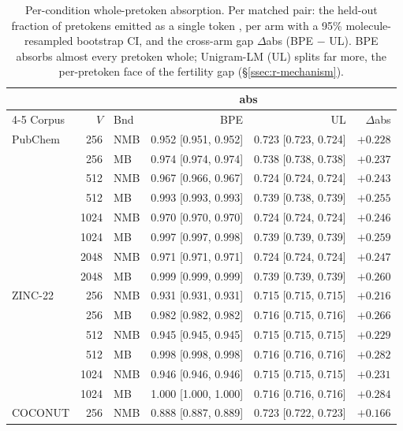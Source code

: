 \begin{table}[htbp]
  \centering
  \caption{Per-condition whole-pretoken absorption. Per matched pair: the held-out fraction of pretokens emitted as a single token \citep{reddy2025diminishing-tokenization}, per arm with a 95\% molecule-resampled bootstrap CI, and the cross-arm gap $\Delta$abs (BPE $-$ UL). BPE absorbs almost every pretoken whole; Unigram-LM (UL) splits far more, the per-pretoken face of the fertility gap (\S\ref{ssec:r-mechanism}).}
  \label{tab:results-absorption}
  \footnotesize
  \begin{tabular}{@{}l r l r r r@{}}
    \toprule
    & & & \multicolumn{2}{c}{abs} & \\
    \cmidrule(lr){4-5}
    Corpus & $V$ & Bnd & BPE & UL & $\Delta$abs \\
    \midrule
    PubChem & 256 & NMB & 0.952 [0.951, 0.952] & 0.723 [0.723, 0.724] & $+0.228$ \\
     & 256 & MB & 0.974 [0.974, 0.974] & 0.738 [0.738, 0.738] & $+0.237$ \\
     & 512 & NMB & 0.967 [0.966, 0.967] & 0.724 [0.724, 0.724] & $+0.243$ \\
     & 512 & MB & 0.993 [0.993, 0.993] & 0.739 [0.738, 0.739] & $+0.255$ \\
     & 1024 & NMB & 0.970 [0.970, 0.970] & 0.724 [0.724, 0.724] & $+0.246$ \\
     & 1024 & MB & 0.997 [0.997, 0.998] & 0.739 [0.739, 0.739] & $+0.259$ \\
     & 2048 & NMB & 0.971 [0.971, 0.971] & 0.724 [0.724, 0.724] & $+0.247$ \\
     & 2048 & MB & 0.999 [0.999, 0.999] & 0.739 [0.739, 0.739] & $+0.260$ \\
    \addlinespace
    ZINC-22 & 256 & NMB & 0.931 [0.931, 0.931] & 0.715 [0.715, 0.715] & $+0.216$ \\
     & 256 & MB & 0.982 [0.982, 0.982] & 0.716 [0.715, 0.716] & $+0.266$ \\
     & 512 & NMB & 0.945 [0.945, 0.945] & 0.715 [0.715, 0.715] & $+0.229$ \\
     & 512 & MB & 0.998 [0.998, 0.998] & 0.716 [0.716, 0.716] & $+0.282$ \\
     & 1024 & NMB & 0.946 [0.946, 0.946] & 0.715 [0.715, 0.715] & $+0.231$ \\
     & 1024 & MB & 1.000 [1.000, 1.000] & 0.716 [0.716, 0.716] & $+0.284$ \\
    \addlinespace
    COCONUT & 256 & NMB & 0.888 [0.887, 0.889] & 0.723 [0.722, 0.723] & $+0.166$ \\

\end{tabular}
\end{table}
